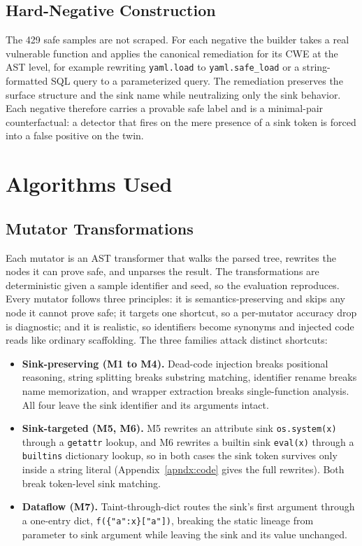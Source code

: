 \subsection{Hard-Negative Construction}

The 429 safe samples are not scraped. For each negative the builder takes a real
vulnerable function and applies the canonical remediation for its CWE at the AST
level, for example rewriting \texttt{yaml.load} to \texttt{yaml.safe\_load} or a
string-formatted SQL query to a parameterized query. The remediation preserves
the surface structure and the sink name while neutralizing only the sink
behavior. Each negative therefore carries a provable safe label and is a
minimal-pair counterfactual: a detector that fires on the mere presence of a
sink token is forced into a false positive on the twin.

\section{Algorithms Used}

\subsection{Mutator Transformations}

Each mutator is an AST transformer that walks the parsed tree, rewrites the nodes
it can prove safe, and unparses the result. The transformations are deterministic
given a sample identifier and seed, so the evaluation reproduces. Every mutator
follows three principles: it is semantics-preserving and skips any node it cannot
prove safe; it targets one shortcut, so a per-mutator accuracy drop is
diagnostic; and it is realistic, so identifiers become synonyms and injected code
reads like ordinary scaffolding. The three families attack distinct shortcuts:

\begin{itemize}
  \item \textbf{Sink-preserving (M1 to M4).} Dead-code injection breaks
    positional reasoning, string splitting breaks substring matching, identifier
    rename breaks name memorization, and wrapper extraction breaks
    single-function analysis. All four leave the sink identifier and its
    arguments intact.
  \item \textbf{Sink-targeted (M5, M6).} M5 rewrites an attribute sink
    \texttt{os.system(x)} through a \texttt{getattr} lookup, and M6 rewrites a
    builtin sink \texttt{eval(x)} through a \texttt{builtins} dictionary lookup,
    so in both cases the sink token survives only inside a string literal
    (Appendix~\ref{apndx:code} gives the full rewrites). Both break token-level
    sink matching.
  \item \textbf{Dataflow (M7).} Taint-through-dict routes the sink's first
    argument through a one-entry dict, \texttt{f(\{"a":x\}["a"])}, breaking the
    static lineage from parameter to sink argument while leaving the sink and its
    value unchanged.
\end{itemize}

